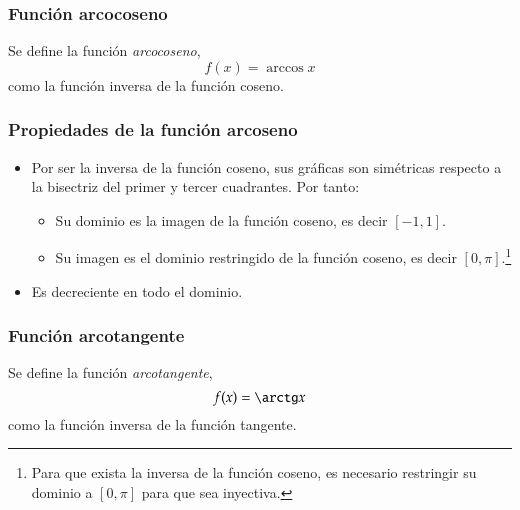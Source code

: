\begin{frame}
\frametitle{Función arcocoseno}
\begin{definicion}
Se define la función \emph{arcocoseno},
\[f(x)=\arccos x\]
como la función inversa de la función coseno.
\end{definicion}
\begin{center}
\scalebox{1}{}
\end{center}
\end{frame} 


\begin{frame}
\frametitle{Propiedades de la función arcoseno}
\begin{itemize}
\item Por ser la inversa de la función coseno, sus gráficas son simétricas respecto a la bisectriz del primer y tercer cuadrantes. Por tanto:
\begin{itemize}
\item Su dominio es la imagen de la función coseno, es decir $[-1,1]$.
\item Su imagen es el dominio restringido de la función coseno, es decir $[0,\pi]$.\footnote{Para que exista la inversa de la función coseno, es necesario restringir su dominio a $[0,\pi]$ para que sea inyectiva.}
\end{itemize}
\item Es decreciente en todo el dominio.
\end{itemize}
\end{frame} 


\begin{frame}
\frametitle{Función arcotangente}
\begin{definicion}
Se define la función \emph{arcotangente},
\[f(x)=\arctg x\]
como la función inversa de la función tangente.
\end{definicion}
\begin{center}
\scalebox{1}{}
\end{center}
\end{frame} 


